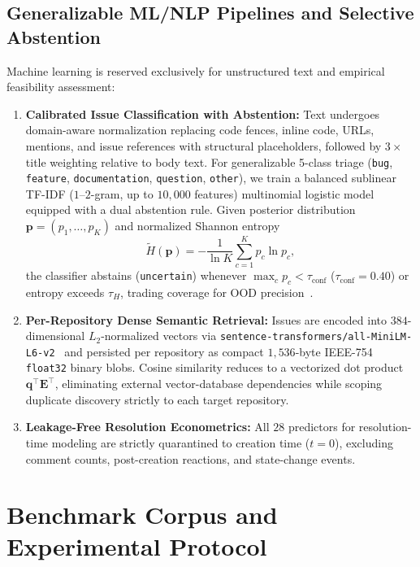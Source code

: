 \documentclass[conference]{IEEEtran}
\begin{document}
\subsection{Generalizable ML/NLP Pipelines and Selective Abstention}
Machine learning is reserved exclusively for unstructured text and empirical feasibility assessment:
\begin{enumerate}
    \item \textbf{Calibrated Issue Classification with Abstention:} Text undergoes domain-aware normalization replacing code fences, inline code, URLs, mentions, and issue references with structural placeholders, followed by $3\times$ title weighting relative to body text. For generalizable 5-class triage (\texttt{bug}, \texttt{feature}, \texttt{documentation}, \texttt{question}, \texttt{other}), we train a balanced sublinear TF-IDF ($1$--$2$-gram, up to $10{,}000$ features) multinomial logistic model equipped with a dual abstention rule. Given posterior distribution $\mathbf{p} = (p_1, \dots, p_K)$ and normalized Shannon entropy
    \begin{equation}
        \tilde{H}(\mathbf{p}) = -\frac{1}{\ln K}\sum_{c=1}^{K} p_c \ln p_c,
    \end{equation}
    the classifier abstains (\texttt{uncertain}) whenever $\max_c p_c < \tau_{\text{conf}}$ ($\tau_{\text{conf}}=0.40$) or entropy exceeds $\tau_H$, trading coverage for OOD precision~\cite{geifman2017selective}.
    \item \textbf{Per-Repository Dense Semantic Retrieval:} Issues are encoded into $384$-dimensional $L_2$-normalized vectors via \texttt{sentence-transformers/all-MiniLM-L6-v2}~\cite{reimers2019sentence,wang2020minilm} and persisted per repository as compact $1{,}536$-byte IEEE-754 \texttt{float32} binary blobs. Cosine similarity reduces to a vectorized dot product $\mathbf{q}^\top \mathbf{E}^\top$, eliminating external vector-database dependencies while scoping duplicate discovery strictly to each target repository.
    \item \textbf{Leakage-Free Resolution Econometrics:} All $28$ predictors for resolution-time modeling are strictly quarantined to creation time ($t=0$), excluding comment counts, post-creation reactions, and state-change events.
\end{enumerate}

\section{Benchmark Corpus and Experimental Protocol}
\label{sec:setup}
\end{document}
